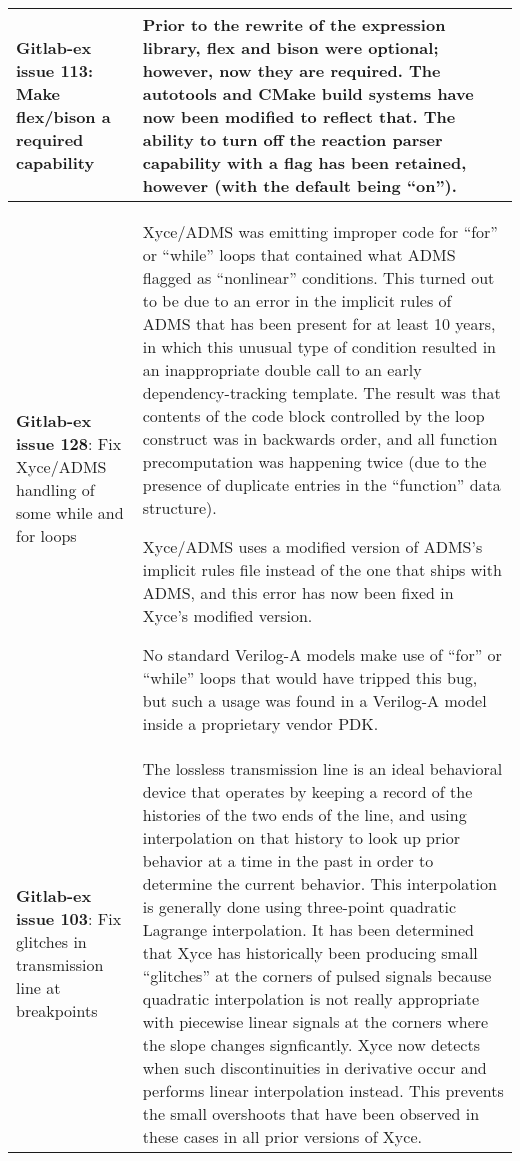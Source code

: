 {\begin{longtable}[h] {>{\raggedright\small}m{2in}|>{\raggedright\let\\\tabularnewline\small}m{3.5in}}
\textbf{Gitlab-ex issue 113}:  Make flex/bison a required capability &
Prior to the rewrite of the expression library, flex and bison were optional;
however, now they are required. The autotools and CMake build systems have now
been modified to reflect that. The ability to turn off the reaction parser
capability with a flag has been retained, however (with the default being
``on'').
\\ \hline

\textbf{Gitlab-ex issue 128}: Fix Xyce/ADMS handling of some while and for loops &
Xyce/ADMS was emitting improper code for ``for'' or ``while'' loops
that contained what ADMS flagged as ``nonlinear'' conditions.  This
turned out to be due to an error in the implicit rules of ADMS that
has been present for at least 10 years, in which this unusual type of
condition resulted in an inappropriate double call to an early
dependency-tracking template.  The result was that contents of the
code block controlled by the loop construct was in backwards order,
and all function precomputation was happening twice (due to the
presence of duplicate entries in the ``function'' data structure).

Xyce/ADMS uses a modified version of ADMS's implicit rules file
instead of the one that ships with ADMS, and this error has now been
fixed in Xyce's modified version.

No standard Verilog-A models make use of ``for'' or ``while'' loops
that would have tripped this bug, but such a usage was found in a
Verilog-A model inside a proprietary vendor PDK. \\ \hline

\textbf{Gitlab-ex issue 103}: Fix glitches in transmission line at breakpoints &
The lossless transmission line is an ideal behavioral device that
operates by keeping a record of the histories of the two ends of the
line, and using interpolation on that history to look up prior
behavior at a time in the past in order to determine the current
behavior.  This interpolation is generally done using three-point
quadratic Lagrange interpolation.  It has been determined that Xyce
has historically been producing small ``glitches'' at the corners of
pulsed signals because quadratic interpolation is not really
appropriate with piecewise linear signals at the corners where the
slope changes signficantly.  Xyce now detects when such
discontinuities in derivative occur and performs linear interpolation
instead.  This prevents the small overshoots that have been observed
in these cases in all prior versions of Xyce. \\ \hline


\end{longtable}}
